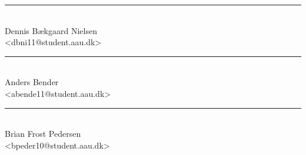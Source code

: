\begin{minipage}[b]{0.45\textwidth}
 \centering
 \vspace{12pt}
 \rule{\textwidth}{0.5pt}\\
  Dennis Bækgaard Nielsen\\
 {\footnotesize <dbni11@student.aau.dk>}\\
 \vspace{12pt}
 \centering
 \vspace{12pt}
 \rule{\textwidth}{0.5pt}\\
  Anders Bender\\
 {\footnotesize <abende11@student.aau.dk>}\\
 \vspace{12pt}
 \centering
 \vspace{12pt}
 \rule{\textwidth}{0.5pt}\\
  Brian Frost Pedersen\\
 {\footnotesize <bpeder10@student.aau.dk>}\\
 \vspace{12pt}
\end{minipage}